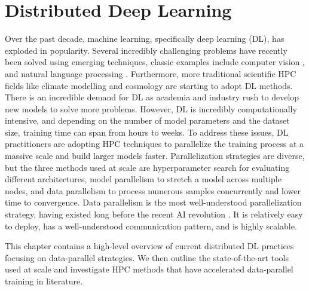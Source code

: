 
\chapter[Distributed Deep Learning]{Distributed Deep Learning}\label{ch:DistributedDL}
Over the past decade, machine learning, specifically deep learning (DL), has exploded in popularity.
Several incredibly challenging problems have recently been solved using emerging techniques, classic examples include computer vision \cite{Krizhevsky2012AlexNet}, and natural language processing \cite{Vaswani2017AttentionTransformer}.
Furthermore, more traditional scientific HPC fields like climate modelling \cite{Ham2019DLENSOForcasts} and cosmology \cite{Mathuriya2019Cosmoflow} are starting to adopt DL methods.
There is an incredible demand for DL as academia and industry rush to develop new models to solve more problems.
However, DL is incredibly computationally intensive, and depending on the number of model parameters and the dataset size, training time can span from hours to weeks.
To address these issues, DL practitioners are adopting HPC techniques to parallelize the training process at a massive scale and build larger models faster.
Parallelization strategies are diverse, but the three methods used at scale are hyperparameter search for evaluating different architectures, model parallelism to stretch a model across multiple nodes, and data parallelism to process numerous samples concurrently and lower time to convergence.
Data parallelism is the most well-understood parallelization strategy, having existed long before the recent AI revolution \cite{Zhang1990BPonCM2}.
It is relatively easy to deploy, has a well-understood communication pattern, and is highly scalable.

This chapter contains a high-level overview of current distributed DL practices focusing on data-parallel strategies.
We then outline the state-of-the-art tools used at scale and investigate HPC methods that have accelerated data-parallel training in literature.

